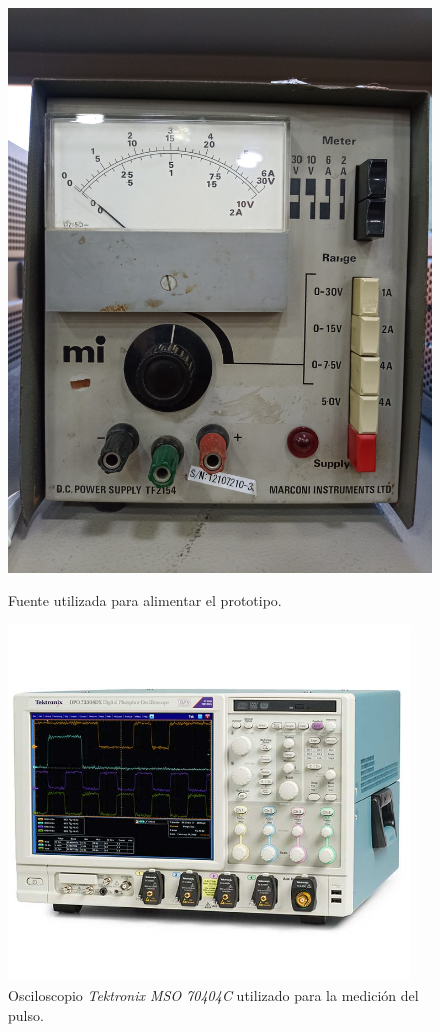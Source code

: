 \begin{figure}[t!]
    \centering
    \begin{minipage}{0.45\linewidth}
        \centering
        \includegraphics[trim=0 10cm 0 20cm, clip, width=.8\textwidth]{images/mediciones_fuente.jpg}
        \caption{Fuente utilizada para alimentar el prototipo.}
        \label{fig:mediciones_fuente}
    \end{minipage}
    \hfill
    \begin{minipage}{0.45\linewidth}
        \centering
        \includegraphics[width=0.95\textwidth]{images/osciloscopio.png}
        \caption{Osciloscopio \textit{Tektronix MSO 70404C} utilizado para la medición del pulso.}
        \label{fig:osciloscopio}
    \end{minipage}
\end{figure}

